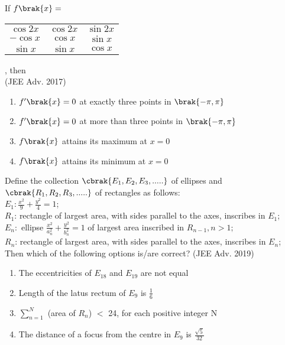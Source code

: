     \item{
        
            If $f\brak{x} = $
	\begin{tabular}{|c c c|} 
	    
		$\cos 2x$& $\cos 2x$ & $\sin 2x$ \\ 
	    
		$- \cos x$& $\cos x$ & $\sin x$\\ 
	    
		$\sin x$ & $\sin x$ & $\cos x$\\ 
	    
	\end{tabular} 
            , then \\
            \text{   } \hfill
                {(JEE Adv. 2017)}
            \begin{enumerate}
                    \item $f^{\prime}\brak{x} = 0$ at exactly three points in $\brak{-\pi,\pi}$
                    \item $f^{\prime}\brak{x} = 0$ at more than three points in $\brak{-\pi,\pi}$
                    \item $f\brak{x}$ attains its maximum at $x=0$
                    \item $f\brak{x}$ attains its minimum at $x=0$
            \end{enumerate}
        
        }
    \item{
        
            Define the collection $\cbrak{E_1, E_2, E_3, .....}$ of ellipses and $\cbrak{R_1, R_2, R_3, .....}$ of rectangles as follows:\\[6pt]
            $E_1 : \frac{x^2}{9}+ \frac{y^2}{4} = 1$;\\[6pt]
            $R_1$: rectangle of largest area, with sides parallel to the axes, inscribes in $E_1$;\\[6pt]
            $E_n : $ ellipse $\frac{x^2}{a_n^2}+ \frac{y^2}{b_n^2} = 1$ of largest area inscribed in $R_{n-1}, n>1;$\\[6pt]
            $R_n$: rectangle of largest area, with sides parallel to the axes, inscribes in $E_n$;\\ Then which of the following options is/are correct?
             \hfill
                {(JEE Adv. 2019)}
            
            \begin{enumerate}
                \item The eccentricities of $E_{18}$ and $E_{19}$ are not equal
                \item Length of the latus rectum of $E_{9}$ is $\frac{1}{6}$
                \item $\sum_{n=1}^N$ (area of $R_n$) $<$ 24, for each positive integer N
                \item The distance of a focus from the centre in $E_9$ is $\frac{\sqrt{5}}{32}$
            \end{enumerate}
        
        }
